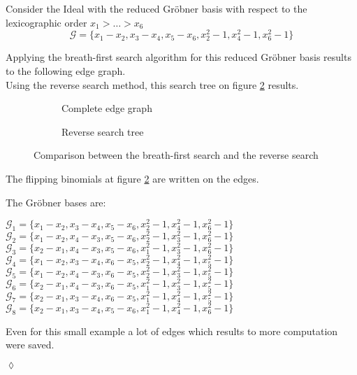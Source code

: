 \begin{env_example}\normalfont
Consider the Ideal with the reduced Gröbner basis with respect to the lexicographic order $x_{1} > \ldots > x_{6} $
\[ \mathcal{G} = \{x_{1} - x_{2}, x_{3} - x_{4}, x_{5}-x_{6} , x_{2}^{2} -1 , x_{4}^{2} - 1, x_{6}^{2} - 1 \} \]

Applying the breath-first search algorithm for this reduced Gröbner basis results to the following edge graph.\\
Using the reverse search method, this search tree on figure \ref{fig:reverse} results.


\begin{figure}[h]
    \centering
    \begin{subfigure}[b]{0.48\linewidth}        %
        \centering
        
        \caption{Complete edge graph}
        \label{fig:breadth}
    \end{subfigure}
    \begin{subfigure}[b]{0.48\linewidth}        %
        \centering
        
        \caption{Reverse search tree}
        \label{fig:reverse}
    \end{subfigure}
    \caption{Comparison between the breath-first search and the reverse search}
    \label{fig:graph}
\end{figure}
\newpage
The flipping binomials at figure \ref{fig:reverse} are written on the edges.

The Gröbner bases are:
\begin{center}
$\mathcal{G}_{1} = \{x_{1}-x_{2},x_{3}-x_{4},x_{5}-x_{6},x_{2}^{2}-1,x_{4}^{2}-1,x_{6}^{2}-1 \} $ \\
$\mathcal{G}_{2} = \{x_{1}-x_{2},x_{4}-x_{3},x_{5}-x_{6},x_{2}^{2}-1,x_{3}^{2}-1,x_{6}^{2}-1 \} $ \\
$\mathcal{G}_{3} = \{x_{2}-x_{1},x_{4}-x_{3},x_{5}-x_{6},x_{1}^{2}-1,x_{3}^{2}-1,x_{6}^{2}-1 \} $ \\
$\mathcal{G}_{4} = \{x_{1}-x_{2},x_{3}-x_{4},x_{6}-x_{5},x_{2}^{2}-1,x_{4}^{2}-1,x_{5}^{2}-1 \} $ \\
$\mathcal{G}_{5} = \{x_{1}-x_{2},x_{4}-x_{3},x_{6}-x_{5},x_{2}^{2}-1,x_{3}^{2}-1,x_{5}^{2}-1 \} $ \\
$\mathcal{G}_{6} = \{x_{2}-x_{1},x_{4}-x_{3},x_{6}-x_{5},x_{1}^{2}-1,x_{3}^{2}-1,x_{5}^{2}-1 \} $ \\
$\mathcal{G}_{7} = \{x_{2}-x_{1},x_{3}-x_{4},x_{6}-x_{5},x_{1}^{2}-1,x_{4}^{2}-1,x_{5}^{2}-1 \} $ \\
$\mathcal{G}_{8} = \{x_{2}-x_{1},x_{3}-x_{4},x_{5}-x_{6},x_{1}^{2}-1,x_{4}^{2}-1,x_{6}^{2}-1 \} $ \\
\end{center}

Even for this small example a lot of edges which results to more computation were saved.
\begin{flushright}
$\lozenge$
\end{flushright}
\end{env_example}




